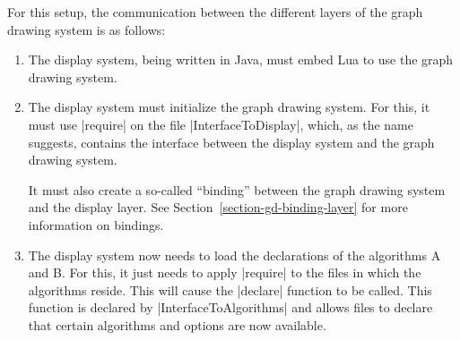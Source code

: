 For this setup, the communication between the different layers of the graph
drawing system is as follows:
%
\begin{enumerate}
    \item The display system, being written in Java, must embed Lua to use the
        graph drawing system.
    \item The display system must initialize the graph drawing system. For
        this, it must use |require| on the file |InterfaceToDisplay|, which, as
        the name suggests, contains the interface between the display system
        and the graph drawing system.

        It must also create a so-called ``binding'' between the graph drawing
        system and the display layer. See
        Section~\ref{section-gd-binding-layer} for more information on
        bindings.
    \item The display system now needs to load the declarations of the
        algorithms A and B. For this, it just needs to apply |require| to the
        files in which the algorithms reside. This will cause the |declare|
        function to be called. This function is declared by
        |InterfaceToAlgorithms| and allows files to declare that certain
        algorithms and options are now available.


\end{enumerate}
